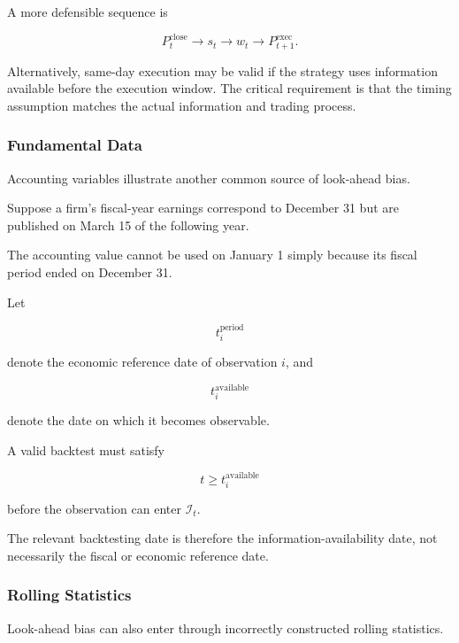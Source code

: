 \documentclass[11pt,a4paper]{article}
\begin{document}
A more defensible sequence is

\begin{equation}
P_t^{\mathrm{close}}
\rightarrow
s_t
\rightarrow
w_t
\rightarrow
P_{t+1}^{\mathrm{exec}}.
\end{equation}

Alternatively, same-day execution may be valid if the strategy uses information
available before the execution window. The critical requirement is that the
timing assumption matches the actual information and trading process.


\subsubsection{Fundamental Data}

Accounting variables illustrate another common source of look-ahead bias.

Suppose a firm's fiscal-year earnings correspond to December 31 but are
published on March 15 of the following year.

The accounting value cannot be used on January 1 simply because its fiscal
period ended on December 31.

Let

\begin{equation}
t_i^{\mathrm{period}}
\end{equation}

denote the economic reference date of observation $i$, and

\begin{equation}
t_i^{\mathrm{available}}
\end{equation}

denote the date on which it becomes observable.

A valid backtest must satisfy

\begin{equation}
\boxed{
t
\geq
t_i^{\mathrm{available}}
}
\end{equation}

before the observation can enter $\mathcal{I}_t$.

The relevant backtesting date is therefore the information-availability date,
not necessarily the fiscal or economic reference date.


\subsubsection{Rolling Statistics}

Look-ahead bias can also enter through incorrectly constructed rolling
statistics.
\end{document}
